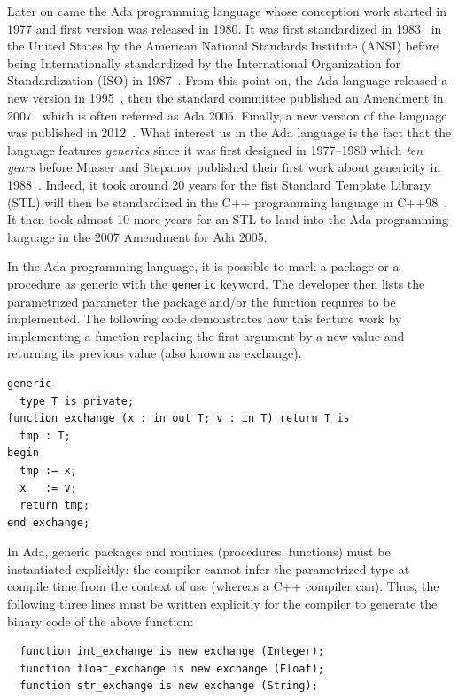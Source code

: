 Later on came the Ada programming language whose conception work started in 1977 and first version was released in 1980.
It was first standardized in 1983~\parencite{ansi.1983.ada} in the United States by the American National Standards
Institute (ANSI) before being Internationally standardized by the International Organization for Standardization (ISO)
in 1987~\parencite{iso.1987.ada}. From this point on, the Ada language released a new version in
1995~\parencite{iso.1995.ada,iso.1995.ada.corr}, then the standard committee published an Amendment in
2007~\parencite{iso.1995.ada.amend} which is often referred as Ada 2005. Finally, a new version of the language was
published in 2012~\parencite{iso.2012.ada,iso.2012.ada.corr}. What interest us in the Ada language is the fact that the
language features \emph{generics} since it was first designed in 1977--1980 which \emph{ten years} before Musser and
Stepanov published their first work about genericity in 1988~\parencite{musser.1988.generic}. Indeed, it took around 20
years for the fist Standard Template Library (STL) will then be standardized in the C++ programming language in
C++98~\parencite{iso.1998.cpp}. It then took almost 10 more years for an STL to land into the Ada programming language
in the 2007 Amendment for Ada 2005.

In the Ada programming language, it is possible to mark a package or a procedure as generic with the \texttt{generic}
keyword. The developer then lists the parametrized parameter the package and/or the function requires to be implemented.
The following code demonstrates how this feature work by implementing a function replacing the first argument by a new
value and returning its previous value (also known as exchange).

\begin{verbatim}
generic
  type T is private;
function exchange (x : in out T; v : in T) return T is
  tmp : T;
begin
  tmp := x;
  x   := v;
  return tmp;
end exchange;
\end{verbatim}

In Ada, generic packages and routines (procedures, functions) must be instantiated explicitly: the compiler cannot infer
the parametrized type at compile time from the context of use (whereas a C++ compiler can). Thus, the following three
lines must be written explicitly for the compiler to generate the binary code of the above function:
\begin{verbatim}
  function int_exchange is new exchange (Integer);
  function float_exchange is new exchange (Float);
  function str_exchange is new exchange (String);
\end{verbatim}

